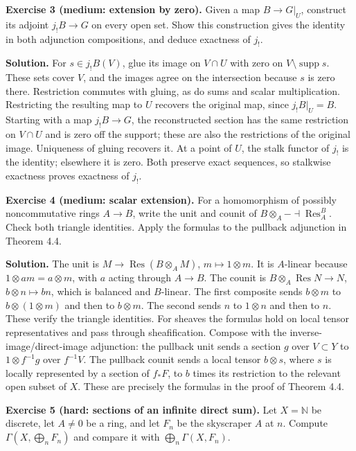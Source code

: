 \documentclass[
  english,
  11pt,
  a4paper,
]{article}
\begin{document}
\textbf{Exercise 3 (medium: extension by zero).} Given a map
\(B\to G|_U\), construct its adjoint \(j_!B\to G\) on every open set.
Show this construction gives the identity in both adjunction
compositions, and deduce exactness of \(j_!\).

\textbf{Solution.} For \(s\in j_!B(V)\), glue its image on \(V\cap U\)
with zero on \(V\setminus\operatorname{supp}s\). These sets cover \(V\),
and the images agree on the intersection because \(s\) is zero there.
Restriction commutes with gluing, as do sums and scalar multiplication.
Restricting the resulting map to \(U\) recovers the original map, since
\(j_!B|_U=B\). Starting with a map \(j_!B\to G\), the reconstructed
section has the same restriction on \(V\cap U\) and is zero off the
support; these are also the restrictions of the original image.
Uniqueness of gluing recovers it. At a point of \(U\), the stalk functor
of \(j_!\) is the identity; elsewhere it is zero. Both preserve exact
sequences, so stalkwise exactness proves exactness of \(j_!\).

\textbf{Exercise 4 (medium: scalar extension).} For a homomorphism of
possibly noncommutative rings \(A\to B\), write the unit and counit of
\(B\otimes_A-\dashv\operatorname{Res}_A^B\). Check both triangle
identities. Apply the formulas to the pullback adjunction in Theorem
4.4.

\textbf{Solution.} The unit is \(M\to\operatorname{Res}(B\otimes_A M)\),
\(m\mapsto1\otimes m\). It is \(A\)-linear because
\(1\otimes am=a\otimes m\), with \(a\) acting through \(A\to B\). The
counit is \(B\otimes_A\operatorname{Res}N\to N\),
\(b\otimes n\mapsto bn\), which is balanced and \(B\)-linear. The first
composite sends \(b\otimes m\) to \(b\otimes(1\otimes m)\) and then to
\(b\otimes m\). The second sends \(n\) to \(1\otimes n\) and then to
\(n\). These verify the triangle identities. For sheaves the formulas
hold on local tensor representatives and pass through sheafification.
Compose with the inverse-image/direct-image adjunction: the pullback
unit sends a section \(g\) over \(V\subset Y\) to \(1\otimes f^{-1}g\)
over \(f^{-1}V\). The pullback counit sends a local tensor
\(b\otimes s\), where \(s\) is locally represented by a section of
\(f_*F\), to \(b\) times its restriction to the relevant open subset of
\(X\). These are precisely the formulas in the proof of Theorem 4.4.

\textbf{Exercise 5 (hard: sections of an infinite direct sum).} Let
\(X=\mathbb N\) be discrete, let \(A\ne0\) be a ring, and let \(F_n\) be
the skyscraper \(A\) at \(n\). Compute \(\Gamma(X,\bigoplus_nF_n)\) and
compare it with \(\bigoplus_n\Gamma(X,F_n)\).
\end{document}

